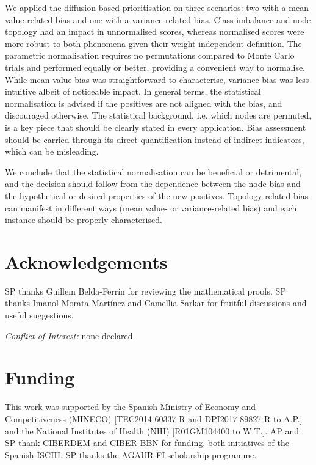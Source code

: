 \documentclass[final]{bioinfo}
\begin{document}
We applied the diffusion-based prioritisation on three scenarios: two with a mean value-related bias and one with a variance-related bias. 
Class imbalance and node topology had an impact in unnormalised scores, whereas
normalised scores were more robust to both phenomena given their weight-independent definition. 
The parametric normalisation requires no permutations compared to Monte Carlo trials and performed equally or better, providing a convenient way to normalise.
While mean value bias was straightforward to characterise, variance bias was less intuitive albeit of noticeable impact. 
In general terms, the statistical normalisation is advised if the positives are not aligned with the bias, and discouraged otherwise. 
The statistical background, i.e. which nodes are permuted, is a key piece that should be clearly stated in every application.
Bias assessment should be carried through its direct quantification instead of indirect indicators, which can be misleading.
 
We conclude that the statistical normalisation can be beneficial or detrimental, and the decision should follow from the dependence between the node bias and the hypothetical or desired properties of the new positives. 
Topology-related bias can manifest in different ways (mean value- or variance-related bias) and each instance should be properly characterised.


\section*{Acknowledgements}

SP thanks Guillem Belda-Ferr\'in for reviewing the mathematical proofs.
SP thanks Imanol Morata Mart\'inez and Camellia Sarkar for fruitful discussions and useful suggestions. 

\textit{Conflict of Interest:} 
none declared

\section*{Funding}
This work was supported by the Spanish Ministry of Economy and Competitiveness (MINECO) [TEC2014-60337-R and DPI2017-89827-R to A.P.] and the National Institutes of Health (NIH) [R01GM104400 to W.T.]. 
AP and SP thank CIBERDEM and CIBER-BBN for funding, both initiatives of the Spanish ISCIII. 
SP thanks the AGAUR FI-scholarship programme.  


%
%
%
%
%
%
%

\end{document}
